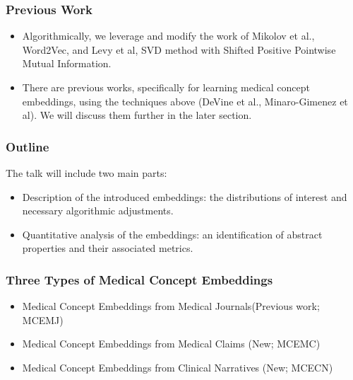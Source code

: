 \documentclass{beamer}
\begin{document}
\begin{frame}
\frametitle{Previous Work}
\begin{itemize}
\item Algorithmically, we leverage and modify 
the work of Mikolov et al., Word2Vec,
and Levy et al, SVD method with Shifted Positive
Pointwise Mutual Information.

\bigskip

\item There are previous works, specifically for
learning medical concept embeddings, using the
techniques above (DeVine et al., Minaro-Gimenez et al).
We will discuss them further in the
later section. 

\end{itemize}
\end{frame}

\begin{frame}
\frametitle{Outline}
\begin{center}
The talk will include two main parts:

\bigskip

\begin{itemize}
\item Description of the introduced embeddings: 
the distributions of interest 
and necessary algorithmic adjustments.

\bigskip

\item Quantitative analysis of the embeddings:
an identification of abstract properties
and their associated metrics.


\end{itemize}
\end{center}
\end{frame}

\begin{frame}
\frametitle{Three Types of Medical Concept Embeddings}
\begin{itemize}
\item Medical Concept Embeddings from Medical
Journals(Previous work; MCEMJ)

\bigskip

\item Medical Concept Embeddings from Medical Claims 
(New; MCEMC)

\bigskip

\item Medical Concept Embeddings from Clinical 
Narratives (New; MCECN)
\end{itemize}
\end{frame}
\end{document}
